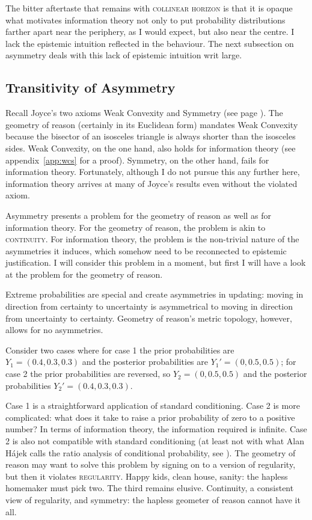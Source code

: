 \documentclass[phd,12pt,oneside]{ubcthesis}
\begin{document}
The bitter aftertaste that remains with \textsc{collinear horizon} is
that it is opaque what motivates information theory not only to put
probability distributions farther apart near the periphery, as I would
expect, but also near the centre. I lack the epistemic intuition
reflected in the behaviour. The next subsection on asymmetry deals
with this lack of epistemic intuition writ large.

\subsection{Transitivity of Asymmetry}
\label{subsec:Asymmetry}

Recall Joyce's two axioms Weak Convexity and Symmetry (see page
\pageref{quot:weakconv}). The geometry of reason (certainly in its
Euclidean form) mandates Weak Convexity because the bisector of an
isosceles triangle is always shorter than the isosceles sides. Weak
Convexity, on the one hand, also holds for information theory (see
appendix~\ref{app:wcs} for a proof). Symmetry, on the
other hand, fails for information theory. Fortunately, although I do not
pursue this any further here, information theory arrives at many of
Joyce's results even without the violated axiom.

Asymmetry presents a problem for the geometry of reason as well as for
information theory. For the geometry of reason, the problem is akin to
\textsc{continuity}. For information theory, the problem is the
non-trivial nature of the asymmetries it induces, which somehow need
to be reconnected to epistemic justification. I will consider this
problem in a moment, but first I will have a look at the problem for
the geometry of reason.

Extreme probabilities are special and create asymmetries in updating:
moving in direction from certainty to uncertainty is asymmetrical to
moving in direction from uncertainty to certainty. Geometry of
reason's metric topology, however, allows for no asymmetries.

\begin{quotex}
  \label{ex:extreme} Consider two cases
  where for case 1 the prior probabilities are $Y_{1}=(0.4,0.3,0.3)$
  and the posterior probabilities are $Y_{1}'=(0,0.5,0.5)$; for case 2
  the prior probabilities are reversed, so $Y_{2}=(0,0.5,0.5)$ and the
  posterior probabilities $Y_{2}'=(0.4,0.3,0.3)$.
\end{quotex}

{\noindent}Case 1 is a straightforward application of standard conditioning. Case
2 is more complicated: what does it take to raise a prior probability
of zero to a positive number? In terms of information theory, the
information required is infinite. Case 2 is also not compatible with
standard conditioning (at least not with what Alan H{\'a}jek calls the
ratio analysis of conditional probability, see ).
The geometry of reason may want to solve this problem by signing on to
a version of regularity, but then it violates \textsc{regularity}.
Happy kids, clean house, sanity: the hapless homemaker must pick two.
The third remains elusive. Continuity, a consistent view of
regularity, and symmetry: the hapless geometer of reason cannot have
it all.
\end{document}
